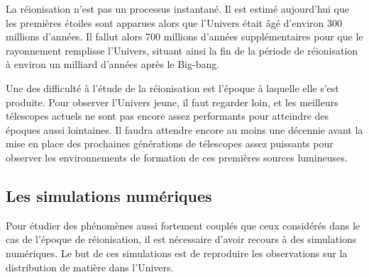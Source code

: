 La réionisation n'est pas un processus instantané.
Il est estimé aujourd'hui que les premières étoiles sont apparues alors que l'Univers était âgé d'environ 300 millions d'années. 
Il fallut alors 700 millions d'années supplémentaires pour que le rayonnement remplisse l'Univers, situant ainsi la fin de la période de réionisation à environ un milliard d'années après le Big-bang.


Une des difficulté à l'étude de la réionisation est l'époque à laquelle elle s'est produite. %
Pour observer l'Univers jeune, il faut regarder loin, et les meilleurs télescopes actuels ne sont pas encore assez performants pour atteindre des époques aussi lointaines.
Il faudra attendre encore au moins une décennie avant la mise en place des prochaines générations de télescopes assez puissants pour observer les environnements de formation de ces premières sources lumineuses.

\subsection*{Les simulations numériques}
Pour étudier des phénomènes aussi fortement couplés que ceux considérés dans le cas de l'époque de réionisation, il est nécessaire d'avoir recours à des simulations numériques. 
Le but de ces simulations est de reproduire les observations sur la distribution de matière dans l'Univers.

